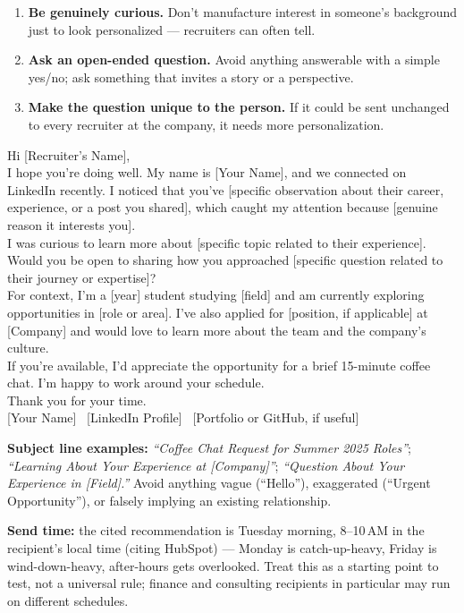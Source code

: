 \begin{enumerate}
  \item \textbf{Be genuinely curious.} Don't manufacture interest in someone's background just to look
  personalized — recruiters can often tell.
  \item \textbf{Ask an open-ended question.} Avoid anything answerable with a simple yes/no; ask something that
  invites a story or a perspective.
  \item \textbf{Make the question unique to the person.} If it could be sent unchanged to every recruiter at the
  company, it needs more personalization.
\end{enumerate}

\begin{template}
Hi [Recruiter's Name],\\[4pt]
I hope you're doing well. My name is [Your Name], and we connected on LinkedIn recently. I noticed that you've
[specific observation about their career, experience, or a post you shared], which caught my attention because
[genuine reason it interests you].\\[4pt]
I was curious to learn more about [specific topic related to their experience]. Would you be open to sharing how
you approached [specific question related to their journey or expertise]?\\[4pt]
For context, I'm a [year] student studying [field] and am currently exploring opportunities in [role or area].
I've also applied for [position, if applicable] at [Company] and would love to learn more about the team and the
company's culture.\\[4pt]
If you're available, I'd appreciate the opportunity for a brief 15-minute coffee chat. I'm happy to work around
your schedule.\\[4pt]
Thank you for your time.\\[4pt]
[Your Name] \textbar\ [LinkedIn Profile] \textbar\ [Portfolio or GitHub, if useful]
\end{template}

\textbf{Subject line examples:} \emph{``Coffee Chat Request for Summer 2025 Roles''}; \emph{``Learning About
Your Experience at [Company]''}; \emph{``Question About Your Experience in [Field].''} Avoid anything vague
(``Hello''), exaggerated (``Urgent Opportunity''), or falsely implying an existing relationship.

\textbf{Send time:} the cited recommendation is Tuesday morning, 8--10\,AM in the recipient's local time (citing
HubSpot) — Monday is catch-up-heavy, Friday is wind-down-heavy, after-hours gets overlooked. Treat this as a
starting point to test, not a universal rule; finance and consulting recipients in particular may run on
different schedules.

